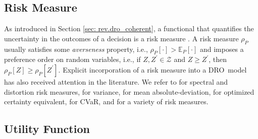 \documentclass[final,onefignum,onetabnum]{class}
\newcommand{\ee}[2]{\mathbb{E}_{#1} \left[ #2 \right]}
\newcommand{\rro}[2]{\rho_{#1} \left[ #2 \right]}
\newcommand{\Cs}[1]{\mathcal{#1}} %
\newcommand{\dro}{DRO}
\begin{document}
\subsection{Risk Measure}
\label{sec: rev.risk}
As introduced in Section \ref{sec: rev.dro_coherent}, a functional that quantifies the uncertainty in the outcomes of a decision is a risk measure \citet{artzner1999,acerbi2002,kusuoka2001,shapiro2013kusuoka}. A  risk measure $\rho_{P}$ usually satisfies some {\it averseness} property, i.e., $\rro{P}{\cdot}>\ee{P}{\cdot}$ and imposes a preference order on random variables, i.e., if $Z, Z^{\prime} \in \Cs{Z}$ and $Z \ge Z^{\prime}$, then $\rro{P}{Z} \ge \rro{P}{Z^{\prime}}$.  Explicit incorporation of  a risk measure into a \dro\ model has also received attention  in the literature. 
We refer to \citet{pflug2012,pichler2013,wozabal2014,pichler2017}
for spectral and distortion risk measures, 
\citet{calafiore2007} for variance,  \citet{calafiore2007} for mean absolute-deviation, \citet{hanasusanto2016,wiesemann2014} for optimized certainty equivalent,  \citet{hanasusanto2015NV} for CVaR, and \citet{postek2016} for a variety of risk measures. 
\subsection{Utility Function}
\label{sec: rev.utility}

\end{document}
